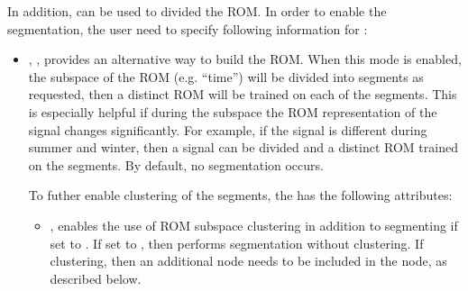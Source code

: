 In addition,  can be used to divided the ROM. In order to enable the segmentation, the
user need to specify following information for :
\begin{itemize}
  \item {}, , provides an alternative way to build the ROM. When
    this mode is enabled, the subspace of the ROM (e.g. ``time'') will be divided into segments as
    requested, then a distinct ROM will be trained on each of the segments. This is especially helpful if
    during the subspace the ROM representation of the signal changes significantly. For example, if the signal
    is different during summer and winter, then a signal can be divided and a distinct ROM trained on the
    segments. By default, no segmentation occurs.

    To futher enable clustering of the segments, the  has the following attributes:
    \begin{itemize}
      \item {},  enables the use of ROM subspace clustering in
        addition to segmenting if set to . If set to , then performs
        segmentation without clustering. If clustering, then an additional node needs to be included in the
         node, as described below.
    \end{itemize}


\end{itemize}
